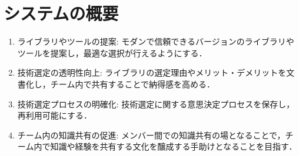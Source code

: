 \documentclass[main]{subfiles}
\begin{document}
\section{システムの概要}

\begin{enumerate}
\item ライブラリやツールの提案: モダンで信頼できるバージョンのライブラリやツールを提案し，最適な選択が行えるようにする．

\item 技術選定の透明性向上: ライブラリの選定理由やメリット・デメリットを文書化し，チーム内で共有することで納得感を高める．

\item 技術選定プロセスの明確化: 技術選定に関する意思決定プロセスを保存し，再利用可能にする．

\item チーム内の知識共有の促進: メンバー間での知識共有の場となることで，チーム内で知識や経験を共有する文化を醸成する手助けとなることを目指す．
\end{enumerate}
\end{document}
